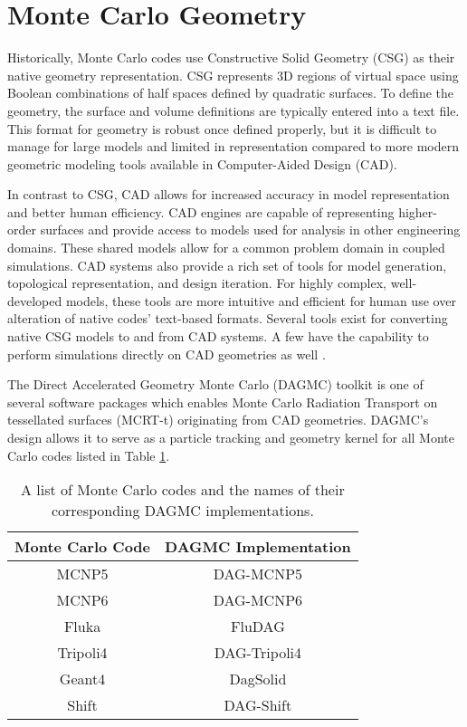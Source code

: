 \section{Monte Carlo Geometry}

Historically, Monte Carlo codes use Constructive Solid Geometry (CSG) as their
native geometry representation. CSG represents 3D regions of virtual space using
Boolean combinations of half spaces defined by quadratic surfaces. To define the
geometry, the surface and volume definitions are typically entered into a text
file. This format for geometry is robust once defined properly, but it is
difficult to manage for large models and limited in representation compared to
more modern geometric modeling tools available in Computer-Aided Design (CAD).

In contrast to CSG, CAD allows for increased accuracy in model representation
and better human efficiency. CAD engines are capable of representing
higher-order surfaces and provide access to models used for analysis in other
engineering domains. These shared models allow for a common problem domain in
coupled simulations. CAD systems also provide a rich set of tools for model
generation, topological representation, and design iteration. For highly
complex, well-developed models, these tools are more intuitive and efficient for
human use over alteration of native codes' text-based formats. Several tools
exist for converting native CSG models to and from CAD systems. A few have the
capability to perform simulations directly on CAD geometries as well
\cite{Leppanen_2015}.

The Direct Accelerated Geometry Monte Carlo (DAGMC) \cite{Tautges_2009} toolkit
is one of several software packages which enables Monte Carlo Radiation
Transport on tessellated surfaces (MCRT-t) originating from CAD
geometries. DAGMC's design allows it to serve as a particle tracking and
geometry kernel for all Monte Carlo codes listed in Table
\ref{tab:dagmc_implementations}.

\begin{table}[H]
  \centering
  \begin{tabular}{c c}
    \hline
    Monte Carlo Code & DAGMC Implementation \\
    \hline
    MCNP5\cite{LANL_MCNP5_VOLIII}            & DAG-MCNP5            \\
    MCNP6\cite{Goorley_2016}                 & DAG-MCNP6            \\
    Fluka\cite{Bohlen_2014}                  & FluDAG               \\
    Tripoli4\cite{Malouch_2017}              & DAG-Tripoli4         \\
    Geant4\cite{GEANT4_2003}                 & DagSolid             \\
    Shift\cite{Pandya_2016}                  & DAG-Shift            \\
    \hline
  \end{tabular}
  \caption[A list of Monte Carlo codes supported by DAGMC.]{A list of Monte Carlo codes and the names of their corresponding DAGMC implementations.}
  \label{tab:dagmc_implementations}
\end{table}

